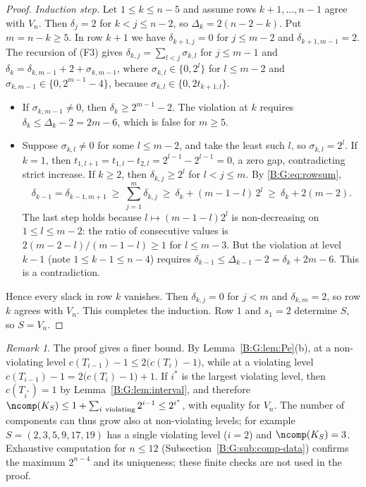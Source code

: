 \documentclass[11pt,a4paper]{article}
\theoremstyle{definition}
\theoremstyle{remark}
\newtheorem{remark}[theorem]{Remark}
\numberwithin{equation}{section}
\begin{document}
\begin{proof}
\emph{Induction step.} Let $1\le k\le n-5$ and assume rows $k+1,\dots,n-1$ agree with $V_n$. Then
$\delta_j=2$ for $k<j\le n-2$, so $\Delta_k=2(n-2-k)$. Put $m=n-k\ge5$. In row $k+1$ we have
$\delta_{k+1,j}=0$ for $j\le m-2$ and $\delta_{k+1,m-1}=2$. The recursion of (F3) gives
$\delta_{k,j}=\sum_{l<j}\sigma_{k,l}$ for $j\le m-1$ and
$\delta_k=\delta_{k,m-1}+2+\sigma_{k,m-1}$, where $\sigma_{k,l}\in\{0,2^l\}$ for $l\le m-2$ and
$\sigma_{k,m-1}\in\{0,2^{m-1}-4\}$, because $\sigma_{k,l}\in\{0,2t_{k+1,l}\}$.
\begin{itemize}
\item If $\sigma_{k,m-1}\ne0$, then $\delta_k\ge2^{m-1}-2$. The violation at $k$ requires
$\delta_k\le\Delta_k-2=2m-6$, which is false for $m\ge5$.
\item Suppose $\sigma_{k,l}\ne0$ for some $l\le m-2$, and take the least such $l$, so
$\sigma_{k,l}=2^l$. If $k=1$, then $t_{1,l+1}=t_{1,l}-t_{2,l}=2^{l-1}-2^{l-1}=0$, a zero gap,
contradicting strict increase. If $k\ge2$, then $\delta_{k,j}\ge2^l$ for $l<j\le m$. By
\eqref{B:G:eq:rowsum},
\[
 \delta_{k-1}=\delta_{k-1,m+1}\ \ge\ \sum_{j=1}^{m}\delta_{k,j}\ \ge\ \delta_k+(m-1-l)\,2^l
 \ \ge\ \delta_k+2(m-2).
\]
The last step holds because $l\mapsto(m-1-l)2^l$ is non-decreasing on $1\le l\le m-2$: the ratio of
consecutive values is $2(m-2-l)/(m-1-l)\ge1$ for $l\le m-3$. But the violation at level $k-1$
(note $1\le k-1\le n-4$) requires $\delta_{k-1}\le\Delta_{k-1}-2=\delta_k+2m-6$. This is a
contradiction.
\end{itemize}
Hence every slack in row $k$ vanishes. Then $\delta_{k,j}=0$ for $j<m$ and $\delta_{k,m}=2$, so row
$k$ agrees with $V_n$. This completes the induction. Row $1$ and $s_1=2$ determine $S$, so
$S=V_n$.
\end{proof}

\begin{remark}\label{B:G:rem:comp}
The proof gives a finer bound. By Lemma~\ref{B:G:lem:Pe}(b), at a non-violating level
$c(T_{i-1})-1\le2\bigl(c(T_i)-1\bigr)$, while at a violating level
$c(T_{i-1})-1=2\bigl(c(T_i)-1\bigr)+1$. If $i^*$ is the largest violating level, then
$c(T_{i^*})=1$ by Lemma~\ref{B:G:lem:interval}, and therefore
$\ncomp(K_S)\le1+\sum_{i\ \text{violating}}2^{i-1}\le2^{i^*}$, with equality for $V_n$.
The number of components can thus grow also at non-violating levels; for example
$S=(2,3,5,9,17,19)$ has a single violating level ($i=2$) and $\ncomp(K_S)=3$. Exhaustive
computation for $n\le12$ (Subsection~\ref{B:G:sub:comp-data}) confirms the maximum $2^{n-4}$ and its
uniqueness; these finite checks are not used in the proof.
\end{remark}
\end{document}
